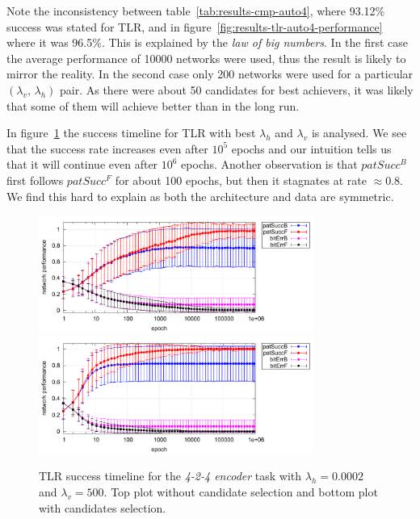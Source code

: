 Note the inconsistency between table~\ref{tab:results-cmp-auto4}, where 93.12\% success was stated for TLR, and in figure~\ref{fig:results-tlr-auto4-performance} where it was 96.5\%. This is explained by the \emph{law of big numbers}. In the first case the average performance of 10000 networks were used, thus the result is likely to mirror the reality. In the second case only 200 networks were used for a particular $(\lambda_v,\,\lambda_h)$ pair. As there were about 50 candidates for best achievers, it was likely that some of them will achieve better than in the long run. 

In figure~\ref{fig:results-tlr-auto4-epoch} the success timeline for TLR with best $\lambda_h$ and $\lambda_v$ is analysed. We see that the success rate increases even after $10^5$ epochs and our intuition tells us that it will continue even after $10^6$ epochs. Another observation is that $patSucc^B$ first follows $patSucc^F$ for about 100 epochs, but then it stagnates at rate $\approx0.8$. We find this hard to explain as both the architecture and data are symmetric. 

\begin{figure}[h]
  \centering
  \includegraphics[width=0.8\textwidth]{img/tlr-auto4-best-perf.pdf}\\
  \includegraphics[width=0.8\textwidth]{img/tlr-auto4-best-can.pdf}      
  \caption{TLR success timeline for the \emph{4-2-4 encoder} task with $\lambda_h=0.0002$ and $\lambda_v=500$. Top plot without candidate selection and bottom plot with candidates selection.}
  \label{fig:results-tlr-auto4-epoch} 
\end{figure}

